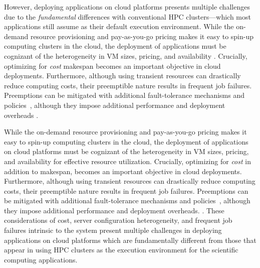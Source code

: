However, deploying applications on cloud platforms presents multiple challenges due to the  \emph{fundamental} differences with conventional HPC clusters---which most applications still assume as their default execution environment.
%
While the on-demand resource provisioning and pay-as-you-go pricing makes it easy to spin-up computing clusters in the cloud,  the deployment of applications  must be cognizant of the heterogeneity in VM sizes, pricing, and availability .
%
Crucially, optimizing for \emph{cost}  makespan\vj{\sout{,}} becomes an important objective in cloud deployments. 
% 
Furthermore, although using transient resources can drastically reduce computing costs, their preemptible nature results in frequent job failures.
%
Preemptions can be mitigated with additional fault-tolerance mechanisms and policies~\cite{flint, marathe2014exploiting}, although they impose additional performance and deployment overheads . 

\vikram
{
While the on-demand resource provisioning and pay-as-you-go pricing makes it easy to spin-up computing clusters in the cloud, the deployment of applications on cloud platforms must be cognizant of the heterogeneity in VM sizes, pricing, and availability for effective resource utilization. Crucially, optimizing for \emph{cost} in addition to makespan, becomes an important objective in cloud deployments. Furthermore, although using transient resources can drastically reduce computing costs, their preemptible nature results in frequent job failures. Preemptions can be mitigated with additional fault-tolerance mechanisms and policies~\cite{flint, marathe2014exploiting}, although they impose additional performance and deployment overheads. . 
These considerations of cost, server configuration heterogeneity, and frequent job failures intrinsic to the system present multiple challenges in deploying applications on cloud platforms which are fundamentally different from those that appear in using HPC clusters as the execution environment for the scientific computing applications.}

